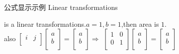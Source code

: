 \documentclass[10pt,aspectratio=43,mathserif,table]{beamer}
\begin{document}
\begin{frame}{公式显示示例 Linear transformations}
\begin{multicols}{3}
	\end{multicols}


	 is a linear transformations.\quad $a=1,b=1 $,then area is $1 $.\\[0.2cm]
	also $\left[\begin{array}{rr}
				i & j \\
			\end{array}\right]\left[\begin{array}{r}
				a \\
				b \\
			\end{array}\right] = \left[\begin{array}{r}
				a \\
				b \\
			\end{array}\right]$\quad $\Rightarrow$ \quad
	$\left[\begin{array}{rr}
				1 & 0 \\
				0 & 1 \\
			\end{array}\right]\left[\begin{array}{r}
				a \\
				b \\
			\end{array}\right] = \left[\begin{array}{r}
				a \\
				b \\
			\end{array}\right]$
\end{frame}
\end{document}
